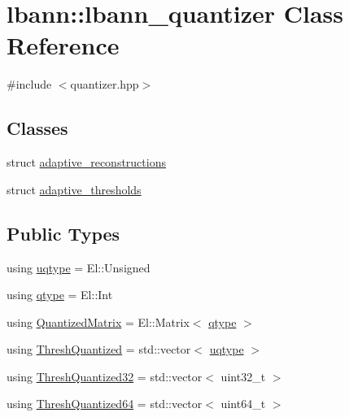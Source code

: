 \hypertarget{classlbann_1_1lbann__quantizer}{}\section{lbann\+:\+:lbann\+\_\+quantizer Class Reference}
\label{classlbann_1_1lbann__quantizer}


{\ttfamily \#include $<$quantizer.\+hpp$>$}

\subsection*{Classes}
\begin{DoxyCompactItemize}
\item 
struct \hyperlink{structlbann_1_1lbann__quantizer_1_1adaptive__reconstructions}{adaptive\+\_\+reconstructions}
\item 
struct \hyperlink{structlbann_1_1lbann__quantizer_1_1adaptive__thresholds}{adaptive\+\_\+thresholds}
\end{DoxyCompactItemize}
\subsection*{Public Types}
\begin{DoxyCompactItemize}
\item 
using \hyperlink{classlbann_1_1lbann__quantizer_ac8b63c86fc871e248ce20c7af19a7fad}{uqtype} = El\+::\+Unsigned
\item 
using \hyperlink{classlbann_1_1lbann__quantizer_afcda642ff1b44d31eec910909c3d013e}{qtype} = El\+::\+Int
\item 
using \hyperlink{classlbann_1_1lbann__quantizer_a399f3f8c393b6021b43e95d1ce6ea28c}{Quantized\+Matrix} = El\+::\+Matrix$<$ \hyperlink{classlbann_1_1lbann__quantizer_afcda642ff1b44d31eec910909c3d013e}{qtype} $>$
\item 
using \hyperlink{classlbann_1_1lbann__quantizer_a85ea8e298c2975b4f802855278406aa7}{Thresh\+Quantized} = std\+::vector$<$ \hyperlink{classlbann_1_1lbann__quantizer_ac8b63c86fc871e248ce20c7af19a7fad}{uqtype} $>$
\item 
using \hyperlink{classlbann_1_1lbann__quantizer_adb72778971f6bb914a14823dd5806702}{Thresh\+Quantized32} = std\+::vector$<$ uint32\+\_\+t $>$
\item 
using \hyperlink{classlbann_1_1lbann__quantizer_a2153502c89432e8762141d84794aac75}{Thresh\+Quantized64} = std\+::vector$<$ uint64\+\_\+t $>$
\end{DoxyCompactItemize}
